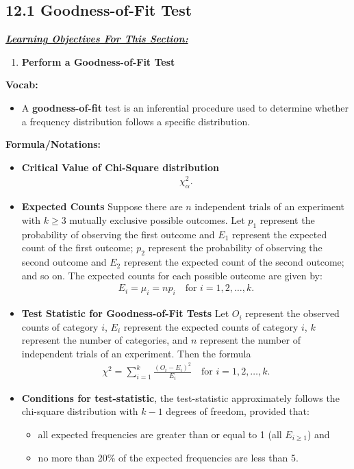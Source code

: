 \documentclass{report}
\begin{document}
    \subsection*{12.1 Goodness-of-Fit Test}
    \bigbreak \noindent 
    \bigbreak \noindent 
    \textbf{\textit{\underline{Learning Objectives For This Section:}}}
    \begin{enumerate}
        \item \textbf{Perform a Goodness-of-Fit Test}
    \end{enumerate}
    \bigbreak \noindent 
    \textbf{Vocab:}
    \begin{itemize}
        \item A \textbf{goodness-of-fit} test is an inferential procedure used to determine whether a frequency distribution follows a specific distribution.
    \end{itemize}
    \bigbreak \noindent \bigbreak \noindent 
    \textbf{Formula/Notations:}
    \begin{itemize}
        \item \textbf{Critical Value of Chi-Square distribution}
            \begin{align*}
                \chi^{2}_{\alpha}
            .\end{align*}
        \item \textbf{Expected Counts}
            Suppose there are $n$ independent trials of an experiment with $k \geq 3$ mutually exclusive possible outcomes. Let $p_1$ represent the probability of observing the first outcome and $E_1$ represent the expected count of the first outcome; $p_2$ represent the probability of observing the second outcome and $E_2$ represent the expected count of the second outcome; and so on.
            \bigbreak \noindent 
            The expected counts for each possible outcome are given by:
            \begin{align*}
                E_i = \mu_i = np_i \quad \text{for } i = 1, 2, \ldots, k
            .\end{align*}
        \item \textbf{Test Statistic for Goodness-of-Fit Tests}
            Let \(O_i\) represent the observed counts of category \(i\), \(E_i\) represent the expected counts of category \(i\), \(k\) represent the number of categories, and \(n\) represent the number of independent trials of an experiment. Then the formula
            \begin{align*}
                \chi^2 = \sum_{i=1}^{k} \frac{(O_i - E_i)^2}{E_i} \quad \text{for } i = 1,2,\ldots,k
            .\end{align*}
        \item \textbf{Conditions for test-statistic}, the test-statistic approximately follows the chi-square distribution with $k-1 $ degrees of freedom, provided that:
            \begin{itemize}
                \item all expected frequencies are greater than or equal to 1 (all $E_{i \geq 1}$) and
                \item no more than 20\% of the expected frequencies are less than 5.
            \end{itemize}

    \end{itemize}
\end{document}
